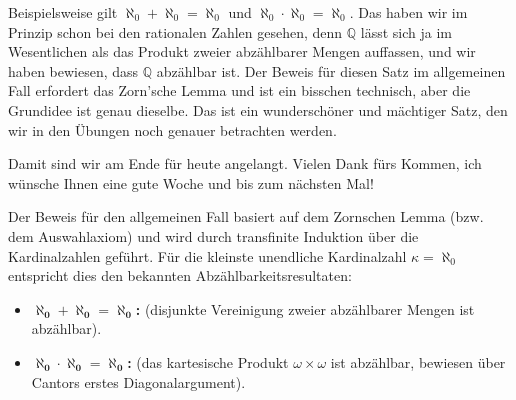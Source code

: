 \begin{spoken-clean}[01:23:00 - 01:25:21]
Beispielsweise gilt $\aleph_0 + \aleph_0 = \aleph_0$ und $\aleph_0 \cdot \aleph_0 = \aleph_0$. Das haben wir im Prinzip schon bei den rationalen Zahlen gesehen, denn $\mathbb{Q}$ lässt sich ja im Wesentlichen als das Produkt zweier abzählbarer Mengen auffassen, und wir haben bewiesen, dass $\mathbb{Q}$ abzählbar ist. Der Beweis für diesen Satz im allgemeinen Fall erfordert das Zorn'sche Lemma und ist ein bisschen technisch, aber die Grundidee ist genau dieselbe. Das ist ein wunderschöner und mächtiger Satz, den wir in den Übungen noch genauer betrachten werden.

Damit sind wir am Ende für heute angelangt. Vielen Dank fürs Kommen, ich wünsche Ihnen eine gute Woche und bis zum nächsten Mal!
\end{spoken-clean}

\begin{math-stroke}

\begin{explanation-of-steps}[Beweisidee]
Der Beweis für den allgemeinen Fall basiert auf dem Zornschen Lemma (bzw. dem Auswahlaxiom) und wird durch transfinite Induktion über die Kardinalzahlen geführt. Für die kleinste unendliche Kardinalzahl $\kappa = \aleph_0$ entspricht dies den bekannten Abzählbarkeitsresultaten:
\begin{itemize}
    \item \textbf{$\boldsymbol{\aleph_0 + \aleph_0 = \aleph_0}$:} (disjunkte Vereinigung zweier abzählbarer Mengen ist abzählbar).
    \item \textbf{$\boldsymbol{\aleph_0 \cdot \aleph_0 = \aleph_0}$:} (das kartesische Produkt $\omega \times \omega$ ist abzählbar, bewiesen über Cantors erstes Diagonalargument).
\end{itemize}
\end{explanation-of-steps}
\end{math-stroke}

